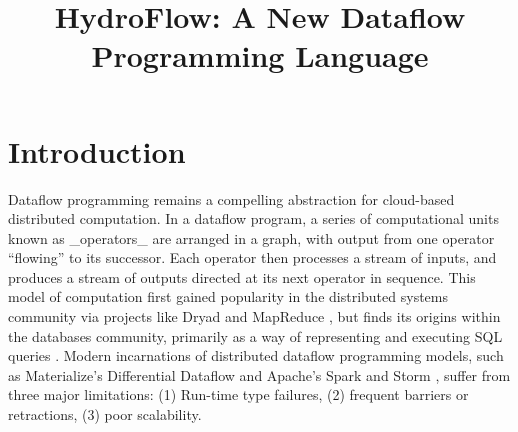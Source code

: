 

\let\Bbbk\relax
\usepackage{amssymb}
\usepackage[checkNoComments]{hydrocomments}
\usepackage{utf8math,ttquot,mathpartir,amsmath, mathtools,multicol,xspace,stmaryrd }




\title{HydroFlow: A New Dataflow Programming Language}




\begin{abstract}


\end{abstract}

\maketitle

\section{Introduction}


Dataflow programming remains a compelling abstraction for cloud-based distributed computation.  In a dataflow program, a series of computational units known as _operators_ are arranged in a graph, with output from one operator ``flowing'' to its successor.  Each operator then processes a stream of inputs, and produces a stream of outputs directed at its next operator in sequence. This model of computation first gained popularity in the distributed systems community via projects like Dryad \cite{dryad} and MapReduce \cite{mapreduce}, but finds its origins within the databases community, primarily as a way of representing and executing SQL queries \cite{sql-dataflow}. Modern incarnations of distributed dataflow programming models, such as Materialize's Differential Dataflow and Apache's Spark and Storm \cite{spark, storm}, suffer from three major limitations: (1) Run-time type failures, (2) frequent barriers or retractions, (3) poor scalability. 

